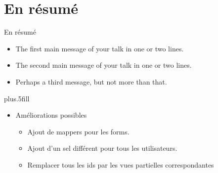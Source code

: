 \section*{En résumé}

\begin{frame}{En résumé}

  \begin{itemize}
  \item
    The \alert{first main message} of your talk in one or two lines.
  \item
    The \alert{second main message} of your talk in one or two lines.
  \item
    Perhaps a \alert{third message}, but not more than that.
  \end{itemize}
  
  \vskip0pt plus.5fill
  \begin{itemize}
  \item
    Améliorations possibles
    \begin{itemize}
    \item
      Ajout de mappers pour les forms.
    \item
      Ajout d'un sel différent pour tous les utilisateurs.
    \item
      Remplacer tous les ids par les vues partielles correspondantes
    \end{itemize}
  \end{itemize}
\end{frame}